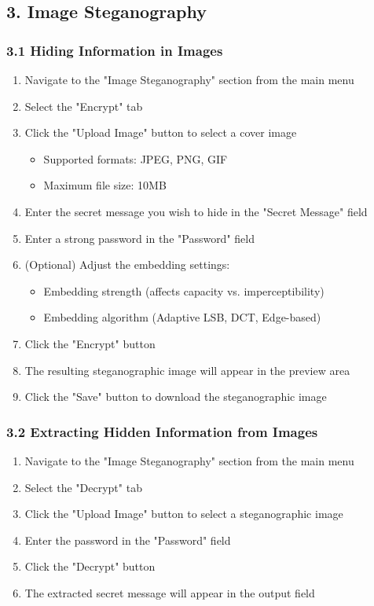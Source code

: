 \documentclass[12pt, a4paper, oneside]{book}
\begin{document}
\subsection*{3. Image Steganography}

\subsubsection*{3.1 Hiding Information in Images}

\begin{enumerate}
    \item Navigate to the "Image Steganography" section from the main menu
    \item Select the "Encrypt" tab
    \item Click the "Upload Image" button to select a cover image
    \begin{itemize}
        \item Supported formats: JPEG, PNG, GIF
        \item Maximum file size: 10MB
    \end{itemize}
    \item Enter the secret message you wish to hide in the "Secret Message" field
    \item Enter a strong password in the "Password" field
    \item (Optional) Adjust the embedding settings:
    \begin{itemize}
        \item Embedding strength (affects capacity vs. imperceptibility)
        \item Embedding algorithm (Adaptive LSB, DCT, Edge-based)
    \end{itemize}
    \item Click the "Encrypt" button
    \item The resulting steganographic image will appear in the preview area
    \item Click the "Save" button to download the steganographic image
\end{enumerate}

\subsubsection*{3.2 Extracting Hidden Information from Images}

\begin{enumerate}
    \item Navigate to the "Image Steganography" section from the main menu
    \item Select the "Decrypt" tab
    \item Click the "Upload Image" button to select a steganographic image
    \item Enter the password in the "Password" field
    \item Click the "Decrypt" button
    \item The extracted secret message will appear in the output field
\end{enumerate}
\end{document}

